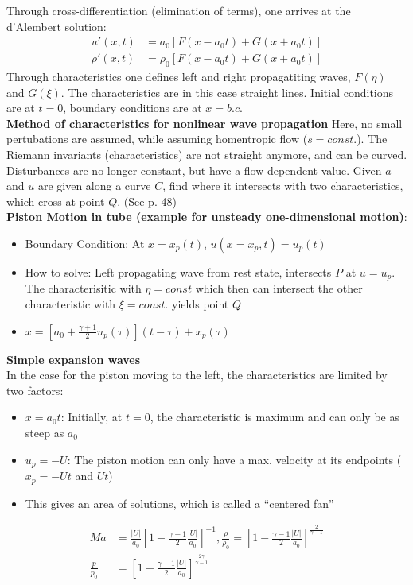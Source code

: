 \documentclass[8pt, landscape, fleqn]{scrartcl}
\begin{document}
\begin{multicols*}{3}
Through cross-differentiation (elimination of terms), one arrives at the d'Alembert solution:
\begin{align*}
    u'(x,t) &= a_0 [F(x-a_0t) + G(x+a_0t)] \\
    \rho'(x,t) &= \rho_0 [F(x-a_0t) + G(x+a_0t)]
\end{align*}
Through characteristics one defines left and right propagatiting waves, $F(\eta)$ and $G(\xi)$. The characteristics are in this case straight lines. Initial conditions are at $t=0$, boundary conditions are at $x=b.c.$ \\

\textbf{Method of characteristics for nonlinear wave propagation}
Here, no small pertubations are assumed, while assuming homentropic flow ($s=const.$). The Riemann invariants (characteristics) are not straight anymore, and can be curved. Disturbances are no longer constant, but have a flow dependent value. Given $a$ and $u$ are given along a curve $C$, find where it intersects with two characteristics, which cross at point $Q$. (See p. 48) \\ 

\textbf{Piston Motion in tube (example for unsteady one-dimensional motion)}:

\begin{itemize}
    \item Boundary Condition: At $x = x_p(t)$, $u(x=x_p,t) = u_p(t)$
    \item How to solve: Left propagating wave from rest state, intersects $P$ at $u=u_p$. The characterisitic with $\eta = const$ which then can intersect the other characteristic with $\xi = const. $ yields point $Q$
    \item $x = \left[ a_0 + \frac{\gamma + 1}{2} u_p(\tau)\right](t-\tau) + x_p(\tau)$
\end{itemize}

\textbf{Simple expansion waves} \\
In the case for the piston moving to the left, the characteristics are limited by two factors:

\begin{itemize}
    \item $x=a_0 t$: Initially, at $t=0$, the characteristic is maximum and can only be as steep as $a_0$
    \item $u_p=-U$: The piston motion can only have a max. velocity at its endpoints ($x_p = -Ut$ and $Ut$)
    \item This gives an area of solutions, which is called a ``centered fan''
\end{itemize}
\begin{align*}
    Ma &= \frac{|U|}{a_0} \left[ 1- \frac{\gamma -1}{2} \frac{|U|}{a_0} \right]^{-1},
    \frac{\rho}{\rho_0} = \left[ 1- \frac{\gamma-1}{2} \frac{|U|}{a_0} \right]^{\frac{2}{\gamma-1}} \\
    \frac{p}{p_0} &= \left[ 1- \frac{\gamma-1}{2} \frac{|U|}{a_0} \right]^{\frac{2 \gamma}{\gamma-1}}
\end{align*}


\end{multicols*}
\end{document}
